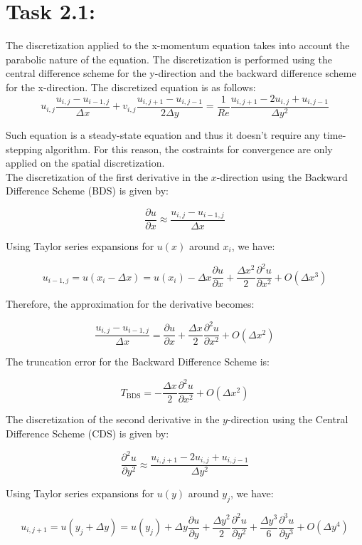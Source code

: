 \documentclass{article}
\begin{document}
\section*{\Large Task 2.1:}
The discretization applied to the x-momentum equation takes into account the parabolic nature of the equation. The discretization is performed using the central difference scheme for the y-direction and the backward difference scheme for the x-direction. The discretized equation is as follows:
\[
  u_{i,j}\frac{u_{i,j} - u_{i-1,j}}{\Delta x}  + v_{i,j} \frac{u_{i,j+1} - u_{i,j-1}}{2 \Delta y} = \frac{1}{Re} \frac{u_{i,j+1} - 2u_{i,j} + u_{i,j-1}}{\Delta y^2}
\]

Such equation is a steady-state equation and thus it doesn't require any time-stepping algorithm. 
For this reason, the costraints for convergence are only applied on the spatial discretization.
\\
The discretization of the first derivative in the \(x\)-direction using the Backward Difference Scheme (BDS) is given by:

\[
\frac{\partial u}{\partial x} \approx \frac{u_{i,j} - u_{i-1,j}}{\Delta x}
\]

Using Taylor series expansions for \( u(x) \) around \( x_i \), we have:

\[
u_{i-1,j} = u(x_i - \Delta x) = u(x_i) - \Delta x \frac{\partial u}{\partial x} + \frac{\Delta x^2}{2} \frac{\partial^2 u}{\partial x^2} + O(\Delta x^3)
\]

Therefore, the approximation for the derivative becomes:

\[
\frac{u_{i,j} - u_{i-1,j}}{\Delta x} = \frac{\partial u}{\partial x} + \frac{\Delta x}{2} \frac{\partial^2 u}{\partial x^2} + O(\Delta x^2)
\]

The truncation error for the Backward Difference Scheme is:

\[
T_{\text{BDS}} = -\frac{\Delta x}{2} \frac{\partial^2 u}{\partial x^2} + O(\Delta x^2)
\]

The discretization of the second derivative in the \(y\)-direction using the Central Difference Scheme (CDS) is given by:

\[
\frac{\partial^2 u}{\partial y^2} \approx \frac{u_{i,j+1} - 2u_{i,j} + u_{i,j-1}}{\Delta y^2}
\]

Using Taylor series expansions for \( u(y) \) around \( y_j \), we have:

\[
u_{i,j+1} = u(y_j + \Delta y) = u(y_j) + \Delta y \frac{\partial u}{\partial y} + \frac{\Delta y^2}{2} \frac{\partial^2 u}{\partial y^2} + \frac{\Delta y^3}{6} \frac{\partial^3 u}{\partial y^3} + O(\Delta y^4)
\]
\end{document}
